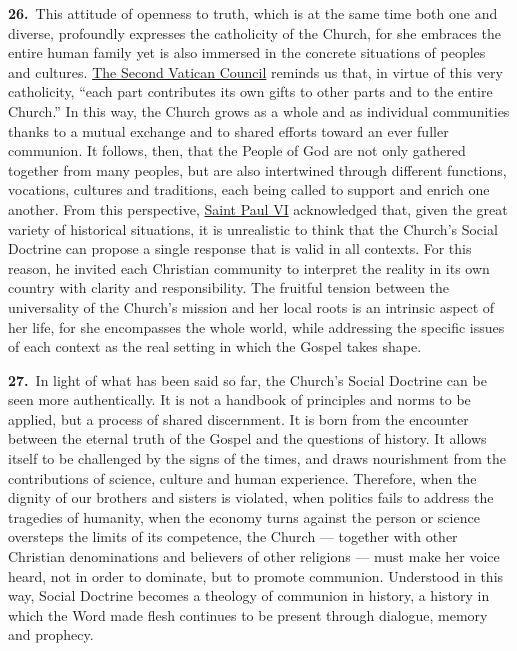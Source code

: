 \documentclass{article}
\begin{document}
\textbf{26.}\ This attitude of openness to truth, which is at the same time both one and diverse, profoundly expresses the catholicity of the Church, for she embraces the entire human family yet is also immersed in the concrete situations of peoples and cultures. \href{https://www.vatican.va/archive/hist_councils/ii_vatican_council/index.htm}{The Second Vatican Council} reminds us that, in virtue of this very catholicity, ``each part contributes its own gifts to other parts and to the entire Church.''\cite{n20} In this way, the Church grows as a whole and as individual communities thanks to a mutual exchange and to shared efforts toward an ever fuller communion. It follows, then, that the People of God are not only gathered together from many peoples, but are also intertwined through different functions, vocations, cultures and traditions, each being called to support and enrich one another. From this perspective, \href{https://www.vatican.va/content/paul-vi/en.html}{Saint Paul VI} acknowledged that, given the great variety of historical situations, it is unrealistic to think that the Church's Social Doctrine can propose a single response that is valid in all contexts.\cite{n21} For this reason, he invited each Christian community to interpret the reality in its own country with clarity and responsibility. The fruitful tension between the universality of the Church's mission and her local roots is an intrinsic aspect of her life, for she encompasses the whole world, while addressing the specific issues of each context as the real setting in which the Gospel takes shape.

\textbf{27.}\ In light of what has been said so far, the Church's Social Doctrine can be seen more authentically. It is not a handbook of principles and norms to be applied, but a process of shared discernment. It is born from the encounter between the eternal truth of the Gospel and the questions of history. It allows itself to be challenged by the signs of the times, and draws nourishment from the contributions of science, culture and human experience. Therefore, when the dignity of our brothers and sisters is violated, when politics fails to address the tragedies of humanity, when the economy turns against the person or science oversteps the limits of its competence,\cite{n22} the Church --- together with other Christian denominations and believers of other religions --- must make her voice heard, not in order to dominate, but to promote communion. Understood in this way, Social Doctrine becomes a theology of communion in history, a history in which the Word made flesh continues to be present through dialogue, memory and prophecy.
\end{document}
